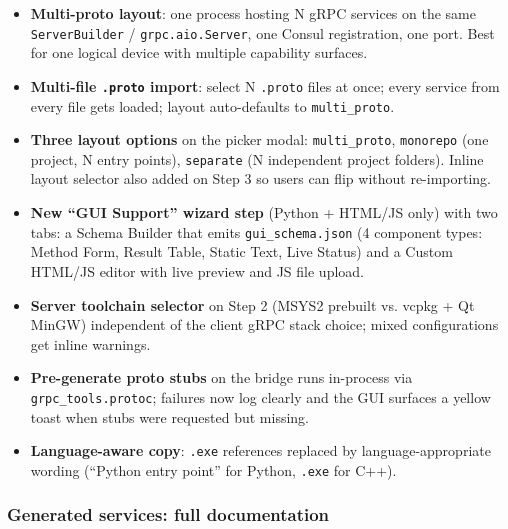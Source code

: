 \begin{itemize}
   \item \textbf{Multi-proto layout}: one process hosting N gRPC services on
         the same \texttt{ServerBuilder} / \texttt{grpc.aio.Server}, one Consul
         registration, one port.  Best for one logical device with multiple
         capability surfaces.
   \item \textbf{Multi-file \texttt{.proto} import}: select N \texttt{.proto}
         files at once; every service from every file gets loaded; layout
         auto-defaults to \texttt{multi\_proto}.
   \item \textbf{Three layout options} on the picker modal: \texttt{multi\_proto},
         \texttt{monorepo} (one project, N entry points), \texttt{separate}
         (N independent project folders).  Inline layout selector also added on
         Step 3 so users can flip without re-importing.
   \item \textbf{New ``GUI Support'' wizard step} (Python + HTML/JS only) with
         two tabs: a Schema Builder that emits \texttt{gui\_schema.json} (4
         component types: Method Form, Result Table, Static Text, Live Status)
         and a Custom HTML/JS editor with live preview and JS file upload.
   \item \textbf{Server toolchain selector} on Step 2 (MSYS2 prebuilt vs.
         vcpkg + Qt MinGW) independent of the client gRPC stack choice; mixed
         configurations get inline warnings.
   \item \textbf{Pre-generate proto stubs} on the bridge runs in-process via
         \texttt{grpc\_tools.protoc}; failures now log clearly and the GUI
         surfaces a yellow toast when stubs were requested but missing.
   \item \textbf{Language-aware copy}: \texttt{.exe} references replaced by
         language-appropriate wording (``Python entry point'' for Python,
         \texttt{.exe} for C++).
\end{itemize}

\subsubsection{Generated services: full documentation}

